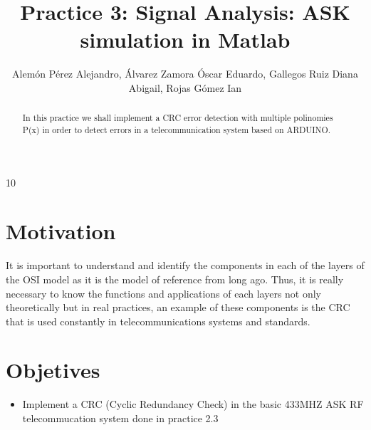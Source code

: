 \documentclass{IEEEtran}
\title{Practice 3: Signal Analysis: ASK simulation in Matlab}
\author{Alemón Pérez Alejandro, Álvarez Zamora Óscar Eduardo, Gallegos Ruiz Diana Abigail, Rojas Gómez Ian }
\begin{document}
	
	\maketitle
	\begin{abstract}
	In this practice we shall implement a CRC error detection with multiple polinomies P(x) in order to detect errors in a telecommunication system based on ARDUINO.
	\end{abstract}10
	\section{Motivation}	
		It is important to understand and identify the components in each of the layers of the OSI model as it is the model of reference from long ago. Thus, it is really necessary to know the functions and applications of each layers not only theoretically but in real practices, an example of these components is the CRC that is used constantly in telecommunications systems and standards.
	
	\section{Objetives}
		\begin{itemize}
			
			\item 	Implement a CRC (Cyclic Redundancy Check) in the basic 433MHZ ASK RF telecommucation system done in practice 2.3
			
		\end{itemize}

	
	
	
	
\end{document}
